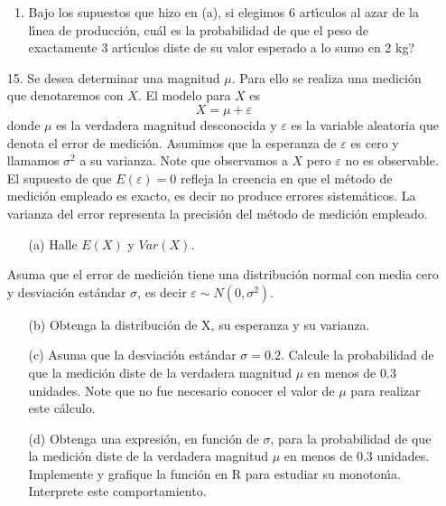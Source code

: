 \documentclass[11pt,a4paper,twoside]{article}%
\begin{document}
\begin{enumerate}
\begin{enumerate}
\item Bajo los supuestos que hizo en (a), si elegimos 6 art\'{\i}culos al azar
de la l\'{\i}nea de producci\'{o}n, \textquestiondown cu\'{a}l es la
probabilidad de que el peso de exactamente 3 art\'{\i}culos diste de su valor
esperado a lo sumo en 2 kg?
\end{enumerate}

\item[15.] Se desea determinar una magnitud $\mu$. Para ello se realiza una
medici\'{o}n que denotaremos con $X$. El modelo para $X$ es
\[
X=\mu+\varepsilon
\]
donde $\mu$ es la verdadera magnitud desconocida y $\varepsilon$ es la
variable aleatoria que denota el error de medici\'{o}n. Asumimos que la
esperanza de $\varepsilon$ es cero y llamamos $\sigma^{2}$ a su varianza. Note
que observamos a $X$ pero $\varepsilon$ no es observable. El supuesto de que
$E\left(  \varepsilon\right)  =0$ refleja la creencia en que el m\'{e}todo de
medici\'{o}n empleado es exacto, es decir no produce errores sistem\'{a}ticos.
La varianza del error representa la precisi\'{o}n del m\'{e}todo de medici\'{o}n empleado.

\begin{enumerate}
\item[(a)] Halle $E(X)$ y $Var(X)$.
\end{enumerate}

Asuma que el error de medici\'{o}n tiene una distribuci\'{o}n normal con media
cero y desviaci\'{o}n est\'{a}ndar $\sigma$, es decir $\varepsilon\sim
N\left(  0,\sigma^{2}\right)  $.

\begin{enumerate}
\item[(b)] Obtenga la distribuci\'{o}n de X, su esperanza y su varianza.

\item[(c)] Asuma que la desviaci\'{o}n est\'{a}ndar $\sigma=0.2$. Calcule la
probabilidad de que la medici\'{o}n diste de la verdadera magnitud $\mu$ en
menos de $0.3$ unidades. Note que no fue necesario conocer el valor de $\mu$
para realizar este c\'{a}lculo.

\item[(d)] Obtenga una expresi\'{o}n, en funci\'{o}n de $\sigma$, para la probabilidad de que la
medici\'{o}n diste de la verdadera magnitud $\mu$ en menos de $0.3$ unidades. Implemente y grafique la funci\'on en R para estudiar su monoton\'{\i}a. Interprete este comportamiento.
\end{enumerate}
\end{enumerate}
\end{document}

